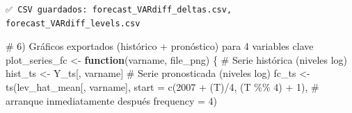 \documentclass[
  spanish,
  letterpaper,
  DIV=11,
  numbers=noendperiod]{scrartcl}
\newenvironment{Shaded}{\begin{snugshade}}{\end{snugshade}}
\newcommand{\AttributeTok}[1]{\textcolor[rgb]{0.40,0.45,0.13}{#1}}
\newcommand{\CommentTok}[1]{\textcolor[rgb]{0.37,0.37,0.37}{#1}}
\newcommand{\ControlFlowTok}[1]{\textcolor[rgb]{0.00,0.23,0.31}{\textbf{#1}}}
\newcommand{\DecValTok}[1]{\textcolor[rgb]{0.68,0.00,0.00}{#1}}
\newcommand{\FunctionTok}[1]{\textcolor[rgb]{0.28,0.35,0.67}{#1}}
\newcommand{\NormalTok}[1]{\textcolor[rgb]{0.00,0.23,0.31}{#1}}
\newcommand{\OtherTok}[1]{\textcolor[rgb]{0.00,0.23,0.31}{#1}}
\newcommand{\SpecialCharTok}[1]{\textcolor[rgb]{0.37,0.37,0.37}{#1}}
\begin{document}
\begin{verbatim}
✅ CSV guardados: forecast_VARdiff_deltas.csv, forecast_VARdiff_levels.csv
\end{verbatim}

\begin{Shaded}
\begin{Highlighting}[]
\CommentTok{\# 6) Gráficos exportados (histórico + pronóstico) para 4 variables clave}
\NormalTok{plot\_series\_fc }\OtherTok{\textless{}{-}} \ControlFlowTok{function}\NormalTok{(varname, file\_png) \{}
  \CommentTok{\# Serie histórica (niveles log)}
\NormalTok{  hist\_ts }\OtherTok{\textless{}{-}}\NormalTok{ Y\_ts[, varname]}
  \CommentTok{\# Serie pronosticada (niveles log)}
\NormalTok{  fc\_ts }\OtherTok{\textless{}{-}} \FunctionTok{ts}\NormalTok{(lev\_hat\_mean[, varname],}
              \AttributeTok{start =} \FunctionTok{c}\NormalTok{(}\DecValTok{2007} \SpecialCharTok{+}\NormalTok{ (T)}\SpecialCharTok{/}\DecValTok{4}\NormalTok{, (T }\SpecialCharTok{\%\%} \DecValTok{4}\NormalTok{) }\SpecialCharTok{+} \DecValTok{1}\NormalTok{),  }\CommentTok{\# arranque inmediatamente después}
              \AttributeTok{frequency =} \DecValTok{4}\NormalTok{)}


\end{Highlighting}
\end{Shaded}
\end{document}
